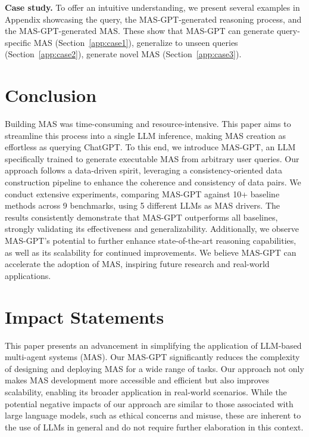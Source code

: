 \documentclass{article}
\theoremstyle{plain}
\theoremstyle{definition}
\theoremstyle{remark}
\begin{document}
\textbf{Case study.}
To offer an intuitive understanding, we present several examples in Appendix showcasing the query, the MAS-GPT-generated reasoning process, and the MAS-GPT-generated MAS.
These show that MAS-GPT can generate query-specific MAS (Section~\ref{app:case1}), generalize to unseen queries (Section~\ref{app:case2}), generate novel MAS (Section~\ref{app:case3}).

\section{Conclusion}
Building MAS was time-consuming and resource-intensive.
This paper aims to streamline this process into a single LLM inference, making MAS creation as effortless as querying ChatGPT.
To this end, we introduce MAS-GPT, an LLM specifically trained to generate executable MAS from arbitrary user queries.
Our approach follows a data-driven spirit, leveraging a consistency-oriented data construction pipeline to enhance the coherence and consistency of data pairs.
We conduct extensive experiments, comparing MAS-GPT against 10+ baseline methods across 9 benchmarks, using 5 different LLMs as MAS drivers.
The results consistently demonstrate that MAS-GPT outperforms all baselines, strongly validating its effectiveness and generalizability.
Additionally, we observe MAS-GPT's potential to further enhance state-of-the-art reasoning capabilities, as well as its scalability for continued improvements.
We believe MAS-GPT can accelerate the adoption of MAS, inspiring future research and real-world applications.


\newpage

\section*{Impact Statements}

This paper presents an advancement in simplifying the application of LLM-based multi-agent systems (MAS).
Our MAS-GPT significantly reduces the complexity of designing and deploying MAS for a wide range of tasks.
Our approach not only makes MAS development more accessible and efficient but also improves scalability, enabling its broader application in real-world scenarios.
While the potential negative impacts of our approach are similar to those associated with large language models, such as ethical concerns and misuse, these are inherent to the use of LLMs in general and do not require further elaboration in this context.
\end{document}
